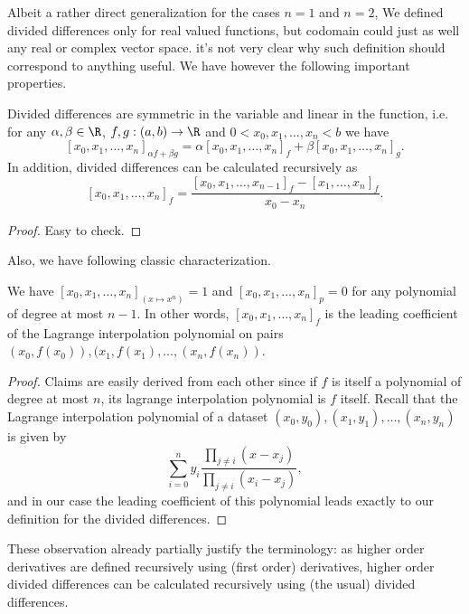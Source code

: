 Albeit a rather direct generalization for the cases $n = 1$ and $n = 2$, We defined divided differences only for real valued functions, but codomain could just as well any real or complex vector space. it's not very clear why such definition should correspond to anything useful. We have however the following important properties.

\begin{prop}
	Divided differences are symmetric in the variable and linear in the function, i.e. for any $\alpha, \beta \in \R$, $f, g : (a, b) \to \R$ and $0 < x_{0}, x_{1}, \ldots, x_{n} < b$ we have
	\[
		[x_{0}, x_{1}, \ldots, x_{n}]_{\alpha f + \beta g} = \alpha [x_{0}, x_{1}, \ldots, x_{n}]_{f} + \beta [x_{0}, x_{1}, \ldots, x_{n}]_{g}.
	\]
	In addition, divided differences can be calculated recursively as
	\[
		[x_{0}, x_{1}, \ldots, x_{n}]_{f} = \frac{[x_{0}, x_{1}, \ldots, x_{n - 1}]_{f} - [x_{1}, \ldots, x_{n}]_{f}}{x_{0} - x_{n}}.
	\]
\end{prop}
\begin{proof}
	Easy to check.
\end{proof}

Also, we have following classic characterization.

\begin{prop}
We have $[x_{0}, x_{1}, \ldots, x_{n}]_{(x \mapsto x^{n})} = 1$ and $[x_{0}, x_{1}, \ldots, x_{n}]_{p} = 0$ for any polynomial of degree at most $n - 1$. In other words, $[x_{0}, x_{1}, \ldots, x_{n}]_{f}$ is the leading coefficient of the Lagrange interpolation polynomial on pairs $(x_{0}, f(x_{0})), (x_{1}, f(x_{1}), \ldots, (x_{n}, f(x_{n}))$.
\end{prop}
\begin{proof}
	Claims are easily derived from each other since if $f$ is itself a polynomial of degree at most $n$, its lagrange interpolation polynomial is $f$ itself. Recall that the Lagrange interpolation polynomial of a dataset $(x_{0}, y_{0}), (x_{1}, y_{1}), \ldots, (x_{n}, y_{n})$ is given by
	\[
		\sum_{i = 0}^{n} y_{i} \frac{\prod_{j \neq i}(x - x_{j})}{\prod_{j \neq i}(x_{i} - x_{j})},
	\]
	and in our case the leading coefficient of this polynomial leads exactly to our definition for the divided differences.
\end{proof}

These observation already partially justify the terminology: as higher order derivatives are defined recursively using (first order) derivatives, higher order divided differences can be calculated recursively using (the usual) divided differences.

